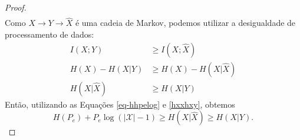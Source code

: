 \begin{proof}
\begin{subequations}
\begin{align}
    \end{align}
  \end{subequations}
  Como $X \rightarrow Y \rightarrow \hat{X}$ é uma cadeia de Markov, podemos utilizar a
  desigualdade de processamento de dados:
  \begin{subequations}\label{hxxhxy}
    \begin{align}
      I(X;Y)        &\geq I(X;\hat{X}) \\
      H(X) - H(X|Y) &\geq H(X) - H(X|\hat{X}) \\
      H(X|\hat{X})  &\geq H(X|Y)
    \end{align}
  \end{subequations}
  Então, utilizando as Equações \ref{eq-hhpelog} e \ref{hxxhxy}, obtemos
  \begin{equation}
    H(P_e) + P_e \log (\vert \mathcal{X} \vert - 1) \geq H(X|\hat{X}) \geq H(X|Y) .
  \end{equation}
\end{proof}





